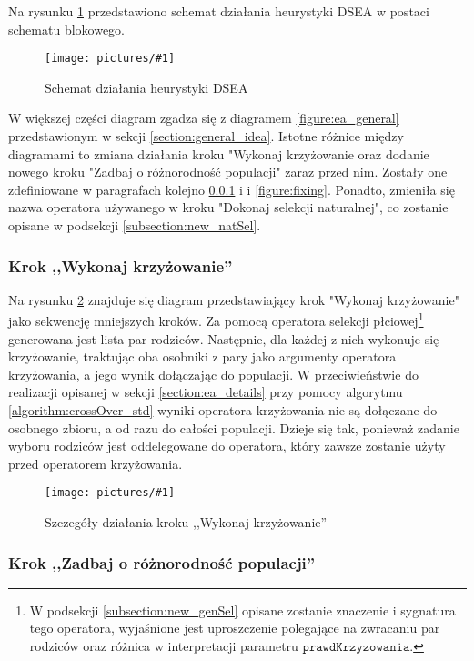 \documentclass[twoside]{iisthesis}
\newcommand{\param}[1]{\mathtt{#1}}
\newcommand{\img}[1]{\centering \texttt{[image: pictures/\#1]}}
\begin{document}
Na rysunku \ref{figure:dsea} przedstawiono schemat działania heurystyki DSEA w postaci schematu blokowego. 

\begin{figure}[H]
	\caption{Schemat działania heurystyki DSEA \label{figure:dsea}}
	\img{dsea.png}
\end{figure}

W większej części diagram zgadza się z diagramem \ref{figure:ea_general} przedstawionym w sekcji \ref{section:general_idea}. 
Istotne różnice między diagramami to zmiana działania kroku "Wykonaj krzyżowanie oraz dodanie nowego kroku "Zadbaj o różnorodność populacji" zaraz przed nim. 
Zostały one zdefiniowane w paragrafach kolejno \ref{subsubsection:my_crossover} i  i \ref{figure:fixing}. 
Ponadto, zmieniła się nazwa operatora używanego w kroku "Dokonaj selekcji naturalnej", co zostanie opisane w podsekcji \ref{subsection:new_natSel}.

\subsubsection{Krok ,,Wykonaj krzyżowanie''} \label{subsubsection:my_crossover}


Na rysunku \ref{figure:my_crossover} znajduje się diagram przedstawiający krok "Wykonaj krzyżowanie" jako sekwencję mniejszych kroków. Za pomocą operatora selekcji płciowej\footnote{
	W podsekcji \ref{subsection:new_genSel} opisane zostanie znaczenie i sygnatura tego operatora, wyjaśnione jest uproszczenie polegające na zwracaniu par rodziców oraz różnica w interpretacji parametru $\param{prawdKrzyzowania}$. 
} generowana jest lista par rodziców. 
Następnie, dla każdej z nich wykonuje się krzyżowanie, traktując oba osobniki z pary jako argumenty operatora krzyżowania, a jego wynik dołączając do populacji. 
W przeciwieństwie do realizacji opisanej w sekcji \ref{section:ea_details} przy pomocy algorytmu \ref{algorithm:crossOver_std} wyniki operatora krzyżowania nie są dołączane do osobnego zbioru, a od razu do całości populacji. 
Dzieje się tak, ponieważ zadanie wyboru rodziców jest oddelegowane do operatora, który zawsze zostanie użyty przed operatorem krzyżowania.

\begin{figure}[h]
	\caption{Szczegóły działania kroku ,,Wykonaj krzyżowanie'' \label{figure:my_crossover}}
	\img{my_crossover.png}
\end{figure}

\subsubsection{Krok ,,Zadbaj o różnorodność populacji''} \label{subsubsection:fixing}
\end{document}
